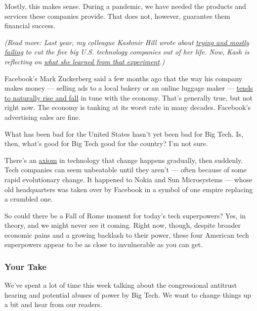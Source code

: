 Mostly, this makes sense. During a pandemic, we have needed the products
and services these companies provide. That does not, however, guarantee
them financial success.

\emph{(Read more: Last year, my colleague Kashmir Hill wrote about}
\href{https://gizmodo.com/c/goodbye-big-five}{\emph{trying and mostly
failing}} \emph{to cut the five big U.S. technology companies out of her
life. Now, Kash is reflecting on}
\href{https://www.nytimes3xbfgragh.onion/2020/07/31/technology/blocking-the-tech-giants.html}{\emph{what
she learned from that experiment}}\emph{.)}

Facebook's Mark Zuckerberg said a few months ago that the way his
company makes money --- selling ads to a local bakery or an online
luggage maker ---
\href{https://www.nytimes3xbfgragh.onion/2020/05/01/technology/coronavirus-big-tech-earnings.html}{tends
to naturally rise and fall} in tune with the economy. That's generally
true, but not right now. The economy is tanking at its worst rate in
many decades. Facebook's advertising sales are fine.

What has been bad for the United States hasn't yet been bad for Big
Tech. Is, then, what's good for Big Tech good for the country? I'm not
sure.

There's an
\href{https://www.oreilly.com/radar/gradually-then-suddenly/\#:~:text=There's\%20a\%20passage\%20in\%20Ernest,happens\%20much\%20the\%20same\%20way.}{axiom}
in technology that change happens gradually, then suddenly. Tech
companies can seem unbeatable until they aren't --- often because of
some rapid evolutionary change. It happened to Nokia and Sun
Microsystems --- whose old headquarters was taken over by Facebook in a
symbol of one empire replacing a crumbled one.

So could there be a Fall of Rome moment for today's tech superpowers?
Yes, in theory, and we might never see it coming. Right now, though,
despite broader economic pains and a growing backlash to their power,
these four American tech superpowers appear to be as close to
invulnerable as you can get.

\hypertarget{your-take}{%
\subsubsection{Your Take}\label{your-take}}

We've spent a lot of time this week talking about the congressional
antitrust hearing and potential abuses of power by Big Tech. We want to
change things up a bit and hear from our readers.

